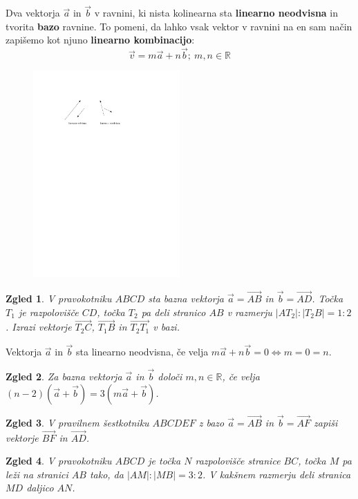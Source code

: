 \documentclass{article}
\newtheorem*{zgled}{Zgled}
\begin{document}
Dva vektorja $\vec{a}$ in $\vec{b}$ v ravnini, ki nista kolinearna sta \textbf{linearno neodvisna} in tvorita \textbf{bazo} ravnine. To pomeni, da lahko vsak vektor v ravnini na en sam način zapišemo kot njuno \textbf{linearno kombinacijo}:
\[\vec{v}=m\vec{a}+n\vec{b};\ m,n\in\mathbb{R}\]

\begin{figure}[H]
    \includegraphics[width=0.5\textwidth]{odvisnost.pdf}
    \centering
\end{figure}

\begin{zgled}
    V pravokotniku $ABCD$ sta bazna vektorja $\vec{a}=\vec{AB}$ in $\vec{b}=\vec{AD}$. Točka $T_1$ je razpolovišče $CD$, točka $T_2$ pa deli stranico $AB$ v razmerju $|AT_2|:|T_2 B|=1:2$. Izrazi vektorje $\vec{T_2 C}$, $\vec{T_1 B}$ in $\vec{T_2 T_1}$ v bazi.
\end{zgled}

Vektorja $\vec{a}$ in $\vec{b}$ sta linearno neodvisna, če velja $m\vec{a}+n\vec{b}=0 \iff m=0=n$.

\begin{zgled}
    Za bazna vektorja $\vec{a}$ in $\vec{b}$ določi $m,n\in\mathbb{R}$, če velja $(n-2)(\vec{a}+\vec{b})=3(m\vec{a}+\vec{b})$.
\end{zgled}

\begin{zgled}
    V pravilnem šestkotniku $ABCDEF$ z bazo $\vec{a}=\vec{AB}$ in $\vec{b}=\vec{AF}$ zapiši vektorje $\vec{BF}$ in $\vec{AD}$.
\end{zgled}

\begin{zgled}
    V pravokotniku $ABCD$ je točka $N$ razpolovišče stranice $BC$, točka $M$ pa leži na stranici $AB$ tako, da $|AM|:|MB|=3:2$. V kakšnem razmerju deli stranica $MD$ daljico $AN$.
\end{zgled}
\end{document}
